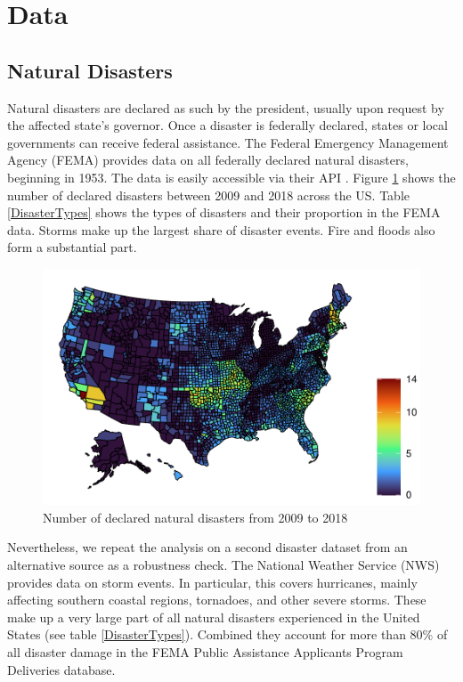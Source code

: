
\section{Data} \label{Data}

\subsection{Natural Disasters}

Natural disasters are declared as such by the president, usually upon request by the affected state's governor. Once a disaster is federally declared, states or local governments can receive federal assistance. The Federal Emergency Management Agency (FEMA) provides data on all federally declared natural disasters, beginning in 1953. The data is easily accessible via their API \citep{rfema}. Figure \ref{DisasterMap} shows the number of declared disasters between 2009 and 2018 across the US. Table \ref{DisasterTypes} shows the types of disasters and their proportion in the FEMA data. Storms make up the largest share of disaster events. Fire and floods also form a substantial part.

\begin{figure}[!h]
	\centering
	\includegraphics[scale=1]{"../Code & Data/DisasterMap.pdf"}
	\caption{Number of declared natural disasters from 2009 to 2018}
	\label{DisasterMap}
\end{figure}




Nevertheless, we repeat the analysis on a second disaster dataset from an alternative source as a robustness check. The National Weather Service (NWS) provides data on storm events. In particular, this covers hurricanes, mainly affecting southern coastal regions, tornadoes, and other severe storms. These make up a very large part of all natural disasters experienced in the United States (see table \ref{DisasterTypes}). Combined they account for more than 80\% of all disaster damage in the FEMA Public Assistance Applicants Program Deliveries database.


